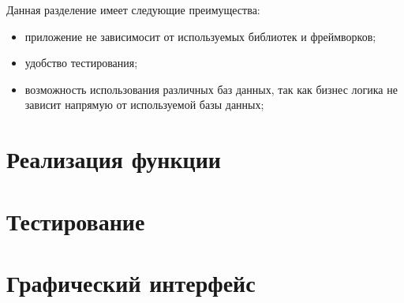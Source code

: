 Данная разделение имеет следующие преимущества:
\begin{itemize}
    \item приложение не зависимосит от используемых библиотек и фреймворков;
    \item удобство тестирования;
    \item возможность использования различных баз данных, так как
    бизнес логика не зависит напрямую от используемой базы данных;
\end{itemize}

\section{Реализация функции}



\section{Тестирование}



\section{Графический интерфейс}

